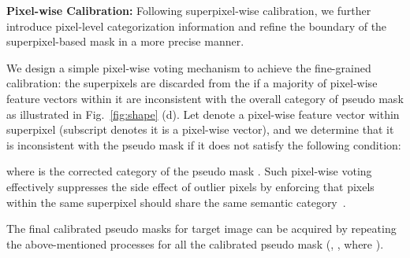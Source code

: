 \documentclass[10pt,twocolumn,letterpaper]{article}
\begin{document}
\noindent \textbf{Pixel-wise Calibration:} 
Following superpixel-wise calibration, we further introduce pixel-level categorization information and refine the boundary of the superpixel-based mask  in a more precise manner. 

We design a simple pixel-wise voting mechanism to achieve the fine-grained calibration: the superpixels are discarded from the  if a majority of pixel-wise feature vectors within it are inconsistent with the overall category of pseudo mask  as illustrated in Fig.~\ref{fig:shape} (d).
Let  denote a pixel-wise feature vector within superpixel  (subscript  denotes it is a pixel-wise vector), and we determine that it is inconsistent with the pseudo mask if it does not satisfy the following condition:

where  is the corrected category of the pseudo mask . 
Such pixel-wise voting effectively suppresses the side effect of outlier pixels by enforcing that pixels within the same superpixel should share the same semantic category~\cite{achanta2012slic}. 

The final calibrated pseudo masks  for target image  can be acquired by repeating the above-mentioned processes for all the calibrated pseudo mask (, , where ). 
\end{document}

